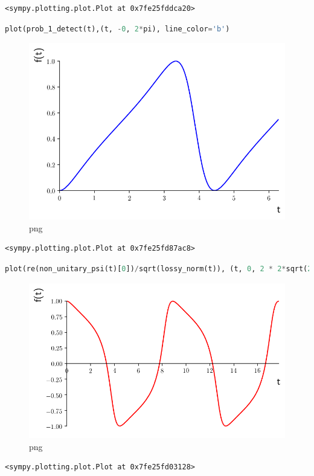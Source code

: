 \begin{lstlisting}
<sympy.plotting.plot.Plot at 0x7fe25fddca20>
\end{lstlisting}

\begin{lstlisting}[language=Python]
plot(prob_1_detect(t),(t, -0, 2*pi), line_color='b')
\end{lstlisting}

\begin{figure}
\centering
\includegraphics[width=0.6\linewidth]{output_35_0.png}
\caption[]{png}
\end{figure}

\begin{lstlisting}
<sympy.plotting.plot.Plot at 0x7fe25fd87ac8>
\end{lstlisting}

\begin{lstlisting}[language=Python]
plot(re(non_unitary_psi(t)[0])/sqrt(lossy_norm(t)), (t, 0, 2 * 2*sqrt(2)*pi), line_color='r')
\end{lstlisting}

\begin{figure}
\centering
\includegraphics[width=0.6\linewidth]{output_36_0.png}
\caption[]{png}
\end{figure}

\begin{lstlisting}
<sympy.plotting.plot.Plot at 0x7fe25fd03128>
\end{lstlisting}

